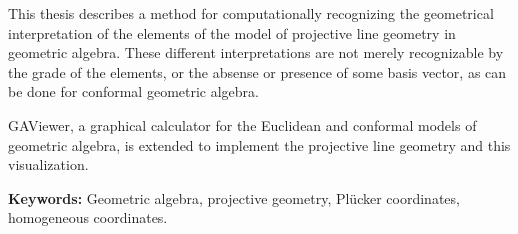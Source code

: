 This thesis describes a method for computationally recognizing the geometrical interpretation of the elements of the model of projective line geometry in geometric algebra.  These different interpretations are not merely recognizable by the grade of the elements, or the absense or presence of some basis vector, as can be done for conformal geometric algebra.

GAViewer, a graphical calculator for the Euclidean and conformal models of geometric algebra, is extended to implement the projective line geometry and this visualization.

\textbf{Keywords:} Geometric algebra, projective geometry, Pl\"ucker coordinates, homogeneous coordinates.

